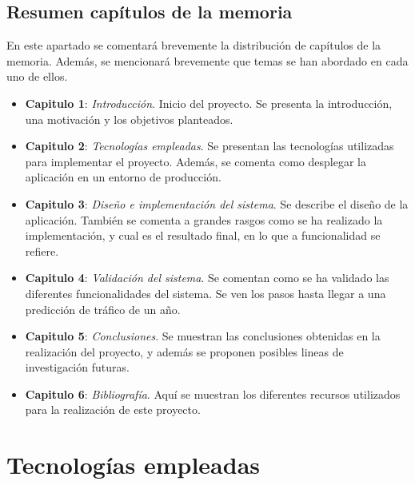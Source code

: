 \documentclass[a4paper, oneside, 12pt]{book}
\begin{document}
	\section{Resumen capítulos de la memoria}
	
	\noindent En este apartado se comentará brevemente la distribución de capítulos de la memoria. Además, se mencionará brevemente que temas se han abordado en cada uno de ellos. \\
	
	\begin{itemize}
		\item \textbf{Capitulo 1}: \textit{Introducción}. Inicio del proyecto. Se presenta la introducción, una motivación y los objetivos planteados. \\
		
		\item \textbf{Capitulo 2}: \textit{Tecnologías empleadas}. Se presentan las tecnologías utilizadas para implementar el proyecto. Además, se comenta como desplegar la aplicación en un entorno de producción. \\
		
		\pagebreak
		
		\item \textbf{Capitulo 3}: \textit{Diseño e implementación del sistema}. Se describe el diseño de la aplicación. También se comenta a grandes rasgos como se ha realizado la implementación, y cual es el resultado final, en lo que a funcionalidad se refiere. \\
		
		\item \textbf{Capitulo 4}: \textit{Validación del sistema}. Se comentan como se ha validado las diferentes funcionalidades del sistema. Se ven los pasos hasta llegar a una predicción de tráfico de un año. \\
		
		\item \textbf{Capitulo 5}: \textit{Conclusiones}. Se muestran las conclusiones obtenidas en la realización del proyecto, y además se proponen posibles lineas de investigación futuras. \\
		
		\item \textbf{Capitulo 6}: \textit{Bibliografía}. Aquí se muestran los diferentes recursos utilizados para la realización de este proyecto.
	\end{itemize}
	
	\pagebreak
	
	\chapter{Tecnologías empleadas}
	
\end{document}

